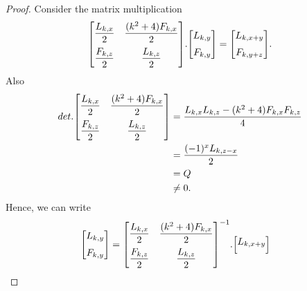 \begin{proof}
Consider the  matrix multiplication
 $${
 \begin{bmatrix}{}
    \dfrac{L_{k,x}}{2} & \dfrac{(k^2+4)F_{k,x}}{2} \vspace{.2cm}\\
    \dfrac{F_{k,z}}{2} & \dfrac{L_{k,z}}{2} \\
	\end{bmatrix}
	}.{
 \begin{bmatrix}{}
    L_{k,y} \vspace{.2cm}\\
    F_{k,y} \\
	\end{bmatrix}
	}={
 \begin{bmatrix}{}
    L_{k,x+y} \vspace{.2cm}\\
    F_{k,y+z} \\
	\end{bmatrix}
	}.$$
	Also
		\begin{align*}
	det.{
 \begin{bmatrix}{}
    \dfrac{L_{k,x}}{2} & \dfrac{(k^2+4)F_{k,x}}{2}\vspace{.2cm} \\
    \dfrac{F_{k,z}}{2} & \dfrac{L_{k,z}}{2} \\
	\end{bmatrix}
	}&=\dfrac{L_{k,x}L_{k,z}-(k^2+4)F_{k,x}F_{k,z}}{4}\\
					&=\frac{(-1)^xL_{k,z-x}}{2}\\
					&=Q\\
					&\neq0.
	\end{align*}
	Hence, we can write
	\begin{align*}
	{
 \begin{bmatrix}{}
    L_{k,y} \vspace{.2cm}\\
    F_{k,y} \\
	\end{bmatrix}
	}&={
 \begin{bmatrix}{}
    \dfrac{L_{k,x}}{2} & \dfrac{(k^2+4)F_{k,x}}{2}\vspace{.2cm} \\
    \dfrac{F_{k,z}}{2} & \dfrac{L_{k,z}}{2} \\
	\end{bmatrix}
	^{-1}}.{
 \begin{bmatrix}{}
    L_{k,x+y} \vspace{.2cm}\\

\end{bmatrix}}
\end{align*}
\end{proof}
